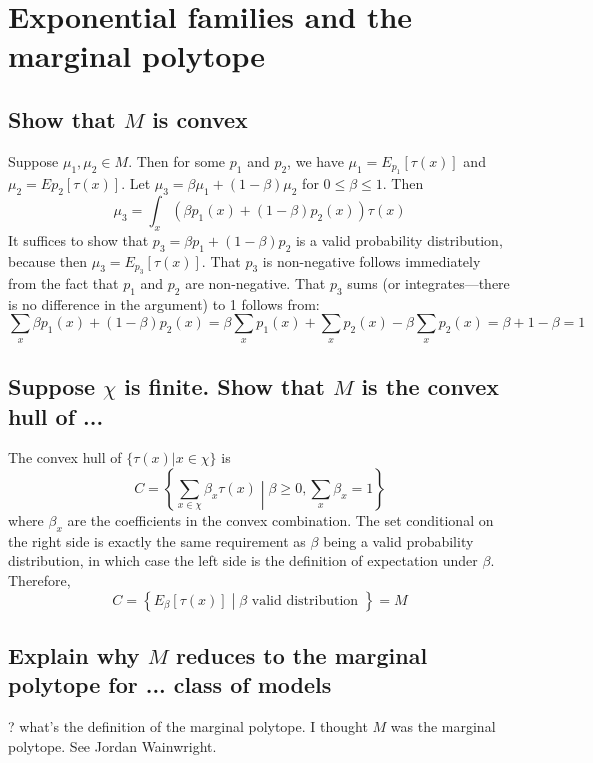 \documentclass[11pt]{article}
\begin{document}
\section{Exponential families and the marginal polytope}
\subsection{Show that $M$ is convex}
Suppose $\mu_1,\mu_2 \in M$. Then for some $p_1$ and $p_2$, we have $\mu_1 = E_{p_1}[\tau(x)]$ and $\mu_2 = E{p_2}[\tau(x)]$. Let $\mu_3 = \beta \mu_1 + (1-\beta) \mu_2$ for $0 \le \beta \le 1$. Then
\[ \mu_3 = \int_x \left( \beta p_1(x) + (1-\beta) p_2(x) \right) \tau(x) \]
It suffices to show that $p_3 = \beta p_1 + (1-\beta)p_2$ is a valid probability distribution, because then $\mu_3 = E_{p_3}[\tau(x)]$. That $p_3$ is non-negative follows immediately from the fact that $p_1$ and $p_2$ are non-negative. That $p_3$ sums (or integrates---there is no difference in the argument) to 1 follows from:
 \[ \sum_x \beta p_1(x) + (1-\beta) p_2(x) = \beta \sum_x p_1(x) + \sum_x p_2(x) - \beta \sum_x p_2(x) = \beta + 1 - \beta = 1\]
\subsection{Suppose $\chi$ is finite. Show that $M$ is the convex hull of ...}
The convex hull of $\{ \tau(x) | x \in \chi \}$ is 
\[ C = \left\{ \sum_{x \in \chi} \beta_x \tau(x) \middle| \beta \ge 0, \sum_x \beta_x = 1\right\} \]
where $\beta_x$ are the coefficients in the convex combination. The set conditional on the right side is exactly the same requirement as $\beta$ being a valid probability distribution, in which case the left side is the definition of expectation under $\beta$.  Therefore,
\[ C = \left\{ E_\beta[\tau(x)] \middle| \beta \mbox { valid distribution }\right\} = M\]
\subsection{Explain why $M$ reduces to the marginal polytope for ... class of models}
? what's the definition of the marginal polytope. I thought $M$ was the marginal polytope. See Jordan Wainwright.
\end{document}
